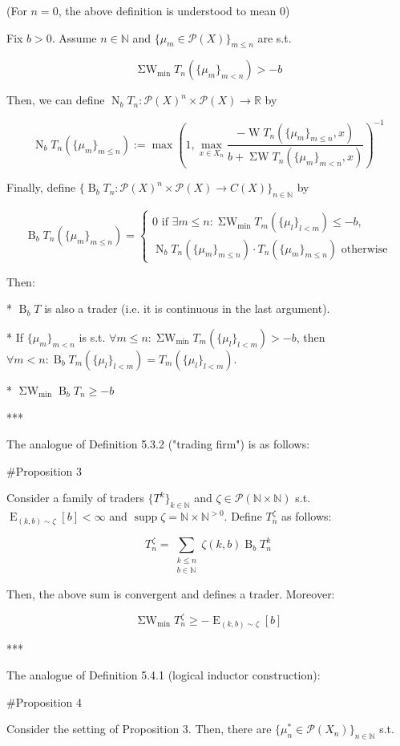 \documentclass[a4paper]{article}
\DeclareMathOperator{\Supp}{supp}
\DeclareMathOperator{\E}{E}
\newcommand{\Nats}{\mathbb{N}}
\newcommand{\Reals}{\mathbb{R}}
\newcommand{\Prob}{\mathcal{P}}
\newcommand{\B}{\operatorname{B}_b}
\newcommand{\N}{\operatorname{N}_b}
\newcommand{\W}{\operatorname{W}}
\newcommand{\SW}{\operatorname{\Sigma W}}
\newcommand{\SWm}{\operatorname{\Sigma W}_{\min}}
\begin{document}
(For ${n=0}$, the above definition is understood to mean 0)

Fix ${b > 0}$. Assume ${n \in \Nats}$ and $\{\mu_m \in \Prob(X)\}_{m \leq n}$ are s.t. 

$$\SWm T_n(\{\mu_m\}_{m < n}) > -b$$

Then, we can define ${\N T_n: \Prob(X)^n \times \Prob(X) \rightarrow \Reals}$ by

$$\N T_n(\{\mu_m\}_{m \leq n}) :=\max(1,\max_{x \in X_n} \frac{-\W T_n(\{\mu_m\}_{m \leq n}, x)}{b + \SW T_n(\{\mu_m\}_{m < n},x)})^{-1}$$

Finally, define ${\{\B T_n: \Prob(X)^n \times \Prob(X) \rightarrow C(X)\}_{n \in \Nats}}$ by

$$\B T_n(\{\mu_m\}_{m \leq n})=\begin{cases}0 \text{ if } \exists m \leq n: \SWm T_m(\{\mu_l\}_{l < m}) \leq -b, \\ \N T_n(\{\mu_m\}_{m \leq n}) \cdot T_n(\{\mu_m\}_{m \leq n}) \text{ otherwise} \end{cases}$$

Then:

* ${\B T}$ is also a trader (i.e. it is continuous in the last argument).

* If ${\{\mu_m\}_{m<n}}$ is s.t. $\forall m \leq n: \SWm T_m(\{\mu_l\}_{l<m}) > -b$, then ${\forall m < n: \B T_m(\{\mu_l\}_{l<m}) = T_m(\{\mu_l\}_{l<m})}$.

* $\SWm\B T_n \geq -b$

***

The analogue of Definition 5.3.2 ("trading firm") is as follows:

\#Proposition 3

Consider a family of traders $\{T^k\}_{k \in \Nats}$ and ${\zeta \in \Prob(\Nats \times \Nats)}$ s.t. ${\E_{(k,b) \sim \zeta}[b] < \infty}$ and ${\Supp \zeta = \Nats \times \Nats^{>0}}$. Define ${T^\zeta_n}$ as follows:

$$T^\zeta_n = \sum_{\substack{k \leq n\\b \in \Nats}} \zeta(k,b) \B T^k_n$$

Then, the above sum is convergent and defines a trader. Moreover:

$$\SWm T^\zeta_n \geq -\E_{(k,b) \sim \zeta}[b]$$

***

The analogue of Definition 5.4.1 (logical inductor construction):

\#Proposition 4

Consider the setting of Proposition 3. Then, there are ${\{\mu^*_n \in \Prob(X_n)\}_{n \in \Nats}}$ s.t.
\end{document}

